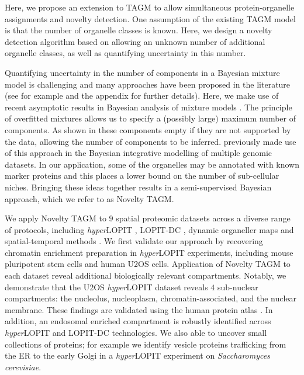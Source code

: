 \documentclass[12pt,english]{article}
\begin{document}
Here, we propose an extension to TAGM to allow simultaneous protein-organelle assignments and novelty detection. One assumption of the existing TAGM model is that the number of organelle classes is known. Here, we design a novelty detection algorithm based on allowing an unknown number of additional organelle classes, as well as quantifying uncertainty in this number.

Quantifying uncertainty in the number of components in a Bayesian mixture model is challenging and many approaches have been proposed in the literature (see for example \cite{ferguson::1974, antoniak::1974, Richardson::1997} and the appendix for further details). Here, we make use of recent asymptotic results in Bayesian analysis of mixture models \citep{Rousseau::2011}. The principle of overfitted mixtures allows us to specify a (possibly large) maximum number of components. As shown in \cite{Rousseau::2011} these components empty if they are not supported by the data, allowing the number of components to be inferred. \cite{Kirk:2012} previously made use of this approach in the Bayesian integrative modelling of multiple genomic datasets. In our application, some of the organelles may be annotated with known marker proteins and this places a lower bound on the number of sub-cellular niches. Bringing these ideas together results in a semi-supervised Bayesian approach, which we refer to as Novelty TAGM.

We apply Novelty TAGM to $9$ spatial proteomic datasets across a diverse range of protocols, including \textit{hyper}LOPIT \citep{hyper, Mulvey:2017}, LOPIT-DC \citep{DC:2018}, dynamic organeller maps \citep{Itzhak:2016} and spatial-temporal methods \citep{Jean_Beltran:2016}. We first validate our approach by recovering chromatin enrichment preparation in \textit{hyper}LOPIT experiments, including mouse pluripotent stem cells and human U2OS cells. Application of Novelty TAGM to each dataset reveal additional biologically relevant compartments. Notably, we demonstrate that the U2OS \textit{hyper}LOPIT dataset reveals $4$ sub-nuclear compartments: the nucleolus,  nucleoplasm, chromatin-associated, and the nuclear membrane. These findings are validated using the human protein atlas \citep{Thul:2017,Sullivan:2018}. In addition, an endosomal enriched compartment is robustly identified across \textit{hyper}LOPIT and LOPIT-DC technologies. We also able to uncover small collections of proteins; for example we identify vesicle proteins trafficking from the ER to the early Golgi in a \textit{hyper}LOPIT experiment on \textit{Saccharomyces cerevisiae}.
\end{document}
